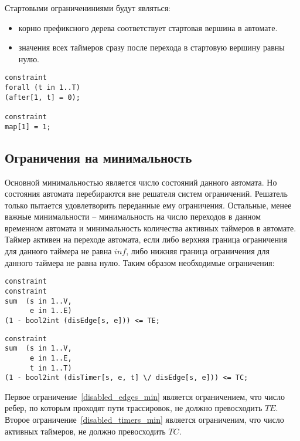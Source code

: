 \documentclass[times,specification,annotation]{itmo-student-thesis}
\begin{document}
Стартовыми ограничениниями будут являться:

\begin{itemize}
  \item корню префиксного дерева соответствует стартовая вершина в автомате. 
  \item значения всех таймеров сразу после перехода в стартовую вершину равны нулю.
\end{itemize}

\begin{lstlisting}[float=!h,language=Mzn,caption={Стартовые ограничения},label={start_constraint}]
constraint
forall (t in 1..T)
(after[1, t] = 0);

constraint
map[1] = 1;
\end{lstlisting}

\subsection{Ограничения на минимальность}

Основной минимальностью является число состояний данного автомата. Но состояния автомата перебираются вне решателя систем ограничений. Решатель только пытается удовлетворить
переданные ему ограничения. Остальные, менее важные минимальности -- минимальность на число переходов в данном временном автомата и минимальность количества
активных таймеров в автомате. Таймер активен на переходе автомата, если либо верхняя граница ограничения для данного таймера не равна $inf$, либо нижняя граница ограничения
для данного таймера не равна нулю. Таким образом необходимые ограничения:

\begin{lstlisting}[float=!h,language=Mzn,caption={Стартовые ограничения-1},label={disabled_edges_min}]
constraint
constraint
sum  (s in 1..V,
      e in 1..E)
(1 - bool2int (disEdge[s, e])) <= TE;
\end{lstlisting}

\begin{lstlisting}[float=!h,language=Mzn,caption={Стартовые ограничения-2},label={disabled_timers_min}]
constraint
sum  (s in 1..V,
      e in 1..E,
      t in 1..T)
(1 - bool2int (disTimer[s, e, t] \/ disEdge[s, e])) <= TC;
\end{lstlisting}

Первое ограничение~\ref{disabled_edges_min} является ограничением, что число ребер, по которым проходят пути трассировок, не должно превосходить $TE$.
Второе ограничение~\ref{disabled_timers_min} является ограниченим, что число активных таймеров, не должно превосходить $TC$.
\end{document}

